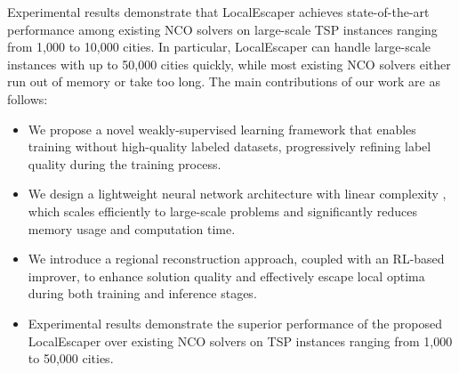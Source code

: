Experimental results demonstrate that LocalEscaper achieves state-of-the-art performance among existing NCO solvers on large-scale TSP instances ranging from 1,000 to 10,000 cities. In particular, LocalEscaper can handle large-scale instances with up to 50,000 cities quickly, while most existing NCO solvers either run out of memory or take too long.
The main contributions of our work are as follows: 
\begin{itemize}
\item %
We propose a novel weakly-supervised learning framework that enables training without high-quality labeled datasets, progressively refining label quality during the training process.
\item We design a lightweight neural network architecture with linear complexity%
, which scales efficiently to large-scale problems and significantly reduces memory usage and computation time.
\item  %
 We introduce a regional reconstruction approach, coupled with an RL-based improver, to enhance solution quality and effectively escape local optima during both training and inference stages. 
 \item  Experimental results demonstrate the superior performance of the proposed LocalEscaper over  existing NCO solvers on TSP instances ranging from 1,000 to 50,000 cities. 
\end{itemize}
